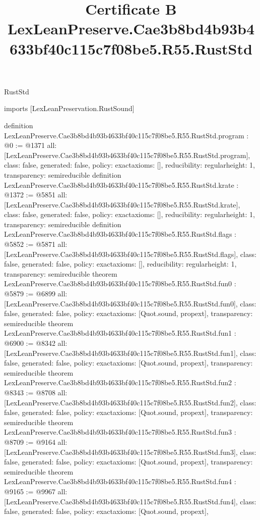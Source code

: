 \begin{lexlean}{RustStd}
\title{Certificate B LexLeanPreserve.Cae3b8bd4b93b4633bf40c115c7f08be5.R55.RustStd}
\begin{coremodule}
imports [LexLeanPreservation.RustSound]

definition LexLeanPreserve.Cae3b8bd4b93b4633bf40c115c7f08be5.R55.RustStd.program : @0 := @1371 {
  all: [LexLeanPreserve.Cae3b8bd4b93b4633bf40c115c7f08be5.R55.RustStd.program],
  class: false,
  generated: false,
  policy: exact{axioms: []},
  reducibility: regular{height: 1},
  transparency: semireducible
}
definition LexLeanPreserve.Cae3b8bd4b93b4633bf40c115c7f08be5.R55.RustStd.krate : @1372 := @5851 {
  all: [LexLeanPreserve.Cae3b8bd4b93b4633bf40c115c7f08be5.R55.RustStd.krate],
  class: false,
  generated: false,
  policy: exact{axioms: []},
  reducibility: regular{height: 1},
  transparency: semireducible
}
definition LexLeanPreserve.Cae3b8bd4b93b4633bf40c115c7f08be5.R55.RustStd.flags : @5852 := @5871 {
  all: [LexLeanPreserve.Cae3b8bd4b93b4633bf40c115c7f08be5.R55.RustStd.flags],
  class: false,
  generated: false,
  policy: exact{axioms: []},
  reducibility: regular{height: 1},
  transparency: semireducible
}
theorem LexLeanPreserve.Cae3b8bd4b93b4633bf40c115c7f08be5.R55.RustStd.fun0 : @5879 := @6899 {
  all: [LexLeanPreserve.Cae3b8bd4b93b4633bf40c115c7f08be5.R55.RustStd.fun0],
  class: false,
  generated: false,
  policy: exact{axioms: [Quot.sound, propext]},
  transparency: semireducible
}
theorem LexLeanPreserve.Cae3b8bd4b93b4633bf40c115c7f08be5.R55.RustStd.fun1 : @6900 := @8342 {
  all: [LexLeanPreserve.Cae3b8bd4b93b4633bf40c115c7f08be5.R55.RustStd.fun1],
  class: false,
  generated: false,
  policy: exact{axioms: [Quot.sound, propext]},
  transparency: semireducible
}
theorem LexLeanPreserve.Cae3b8bd4b93b4633bf40c115c7f08be5.R55.RustStd.fun2 : @8343 := @8708 {
  all: [LexLeanPreserve.Cae3b8bd4b93b4633bf40c115c7f08be5.R55.RustStd.fun2],
  class: false,
  generated: false,
  policy: exact{axioms: [Quot.sound, propext]},
  transparency: semireducible
}
theorem LexLeanPreserve.Cae3b8bd4b93b4633bf40c115c7f08be5.R55.RustStd.fun3 : @8709 := @9164 {
  all: [LexLeanPreserve.Cae3b8bd4b93b4633bf40c115c7f08be5.R55.RustStd.fun3],
  class: false,
  generated: false,
  policy: exact{axioms: [Quot.sound, propext]},
  transparency: semireducible
}
theorem LexLeanPreserve.Cae3b8bd4b93b4633bf40c115c7f08be5.R55.RustStd.fun4 : @9165 := @9967 {
  all: [LexLeanPreserve.Cae3b8bd4b93b4633bf40c115c7f08be5.R55.RustStd.fun4],
  class: false,
  generated: false,
  policy: exact{axioms: [Quot.sound, propext]},
}
\end{coremodule}
\end{lexlean}

